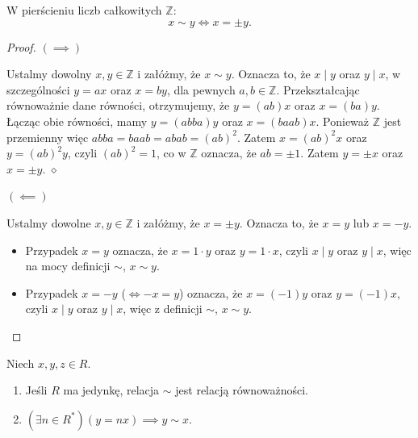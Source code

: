 \begin{eg}
    W pierścieniu liczb całkowitych $\mathbb{Z}$:
    \[
     x \sim y \iff x = \pm y
    .\] 
\end{eg}
\begin{proof}
\noindent $\left( \implies \right) $ 

Ustalmy dowolny $x,y \in \mathbb{Z}$ i załóżmy, że $x\sim y$. Oznacza to, że $x \mid y$ oraz $y\mid x$, w szczególności $y = ax$ oraz  $x = by$, dla pewnych  $a,b \in \mathbb{Z}$. Przekształcając równoważnie dane równości, otrzymujemy, że $y = \left( ab \right) x$ oraz $x = \left( ba \right) y$. Łącząc obie równości, mamy $y = \left( abba \right)y $ oraz $x = \left( baab \right) x$. Ponieważ $\mathbb{Z}$ jest przemienny więc $abba = baab = abab = \left( ab \right) ^2$. Zatem $x = \left( ab \right) ^2x$ oraz $y = \left( ab \right) ^2y$, czyli $\left( ab \right) ^2 = 1$, co w $\mathbb{Z}$ oznacza, że $ab = \pm 1$. Zatem $y = \pm x$ oraz  $x = \pm y$. $\diamond $

\noindent $\left( \impliedby \right) $ 

Ustalmy dowolne $x,y \in \mathbb{Z}$ i załóżmy, że $x = \pm y$. Oznacza to, że  $x = y$ lub  $x = -y$.
 \begin{itemize}
	\item Przypadek $x = y$ oznacza, że  $x = 1\cdot y$ oraz $y = 1\cdot x$, czyli $x \mid y$ oraz $y \mid x$, więc na mocy definicji $\sim  $,  $x\sim y $.
	\item Przypadek $x = -y$ ($\iff -x = y$) oznacza, że $x = \left( -1 \right) y$ oraz $y = \left( -1 \right) x$, czyli $x \mid y$ oraz $y \mid x$, więc z definicji $\sim  $, $x\sim y $.
\end{itemize}
\end{proof} 
\begin{fact}
    Niech $x, y, z \in R$.
    \begin{enumerate}[label=\arabic*)]
        \item Jeśli $R$ ma jedynkę, relacja $\sim$ jest relacją równoważności.
        \item $(\exists n \in R^{\ast})(y = nx) \implies y \sim x$.
    \end{enumerate}
\end{fact}
